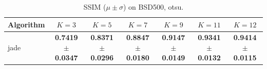 \begin{table}[htbp]
\centering
\caption{SSIM ($\mu \pm \sigma$) on BSD500, otsu.}
\label{tab:exp1-otsu-ssim}
\begin{tabular}{lcccccc}
\toprule
Algorithm & $K=3$ & $K=5$ & $K=7$ & $K=9$ & $K=11$ & $K=12$ \\
\midrule
jade & \textbf{0.7419 $\pm$ 0.0347} & \textbf{0.8371 $\pm$ 0.0296} & \textbf{0.8847 $\pm$ 0.0180} & \textbf{0.9147 $\pm$ 0.0149} & \textbf{0.9341 $\pm$ 0.0132} & \textbf{0.9414 $\pm$ 0.0115} \\
\bottomrule
\end{tabular}
\end{table}